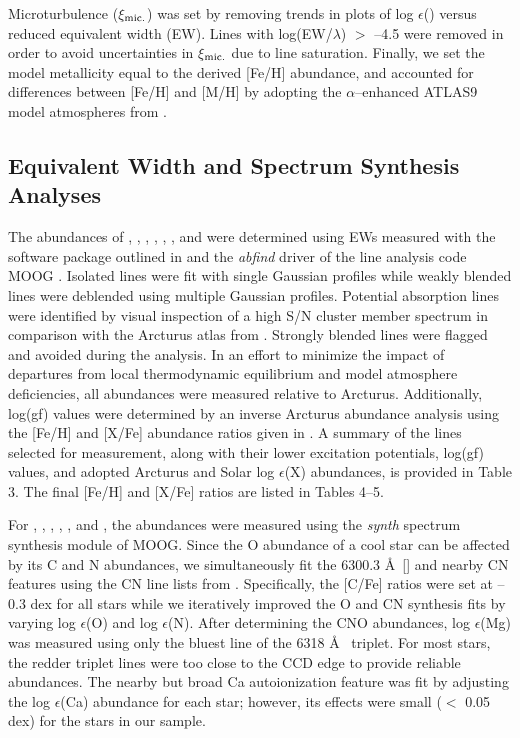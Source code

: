 \documentclass[12pt,preprint]{emulateapj}
\begin{document}
Microturbulence ($\xi$$_{\rm mic.}$) was set by removing trends in plots of 
log $\epsilon$() versus reduced equivalent width (EW).
Lines with log(EW/$\lambda$) $>$ --4.5 were removed in order to avoid 
uncertainties in $\xi$$_{\rm mic.}$ due to line saturation.  Finally, we 
set the model metallicity equal to the derived [Fe/H] abundance, and accounted
for differences between [Fe/H] and [M/H] by adopting the $\alpha$--enhanced
ATLAS9 model atmospheres from \citet{CastelliKurucz04}.

\subsection{Equivalent Width and Spectrum Synthesis Analyses}

The abundances of , , , , 
, , and  were determined using EWs measured
with the software package outlined in \citet{Johnson14} and the \emph{abfind}
driver of the line analysis code MOOG \citep[2014 version]{Sneden73}.  Isolated
lines were fit with single Gaussian profiles while weakly blended lines were
deblended using multiple Gaussian profiles.  Potential absorption lines were 
identified by visual inspection of a high S/N cluster member spectrum in 
comparison with the Arcturus atlas from \citet{Hinkle00}.  Strongly blended 
lines were flagged and avoided during the analysis.  In an effort to minimize
the impact of departures from local thermodynamic equilibrium and model
atmosphere deficiencies, all abundances were measured relative to Arcturus.
Additionally, log(gf) values were determined by an inverse Arcturus abundance
analysis using the [Fe/H] and [X/Fe] abundance ratios given in 
\citet{Johnson12,Johnson14}.  A summary of the lines selected for measurement, 
along with their lower excitation potentials, log(gf) values, and adopted 
Arcturus and Solar log $\epsilon$(X) abundances, is provided in Table 3.
The final [Fe/H] and [X/Fe] ratios are listed in Tables 4--5.

For , , , , , and 
, the abundances were measured using the \emph{synth} spectrum
synthesis module of MOOG.  Since the O abundance of a cool star can be 
affected by its C and N abundances, we simultaneously fit the 6300.3 \AA\ 
[] and nearby CN features using the CN line lists from 
\citet{Sneden14}.  Specifically, the [C/Fe] ratios were set at --0.3 dex for
all stars while we iteratively improved the O and CN synthesis fits by varying 
log $\epsilon$(O) and log $\epsilon$(N).  After determining the CNO abundances,
log $\epsilon$(Mg) was measured using only the bluest line of the 6318 \AA\
 triplet.  For most stars, the redder triplet lines were too close
to the CCD edge to provide reliable abundances.  The nearby but broad Ca
autoionization feature was fit by adjusting the log $\epsilon$(Ca) abundance
for each star; however, its effects were small ($<$ 0.05 dex) for the stars 
in our sample.  
\end{document}
